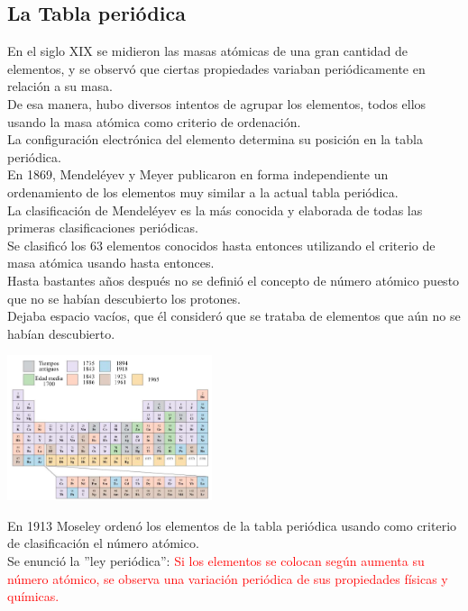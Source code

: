     \subsection{La Tabla periódica}
        \indent En el siglo XIX se midieron las masas atómicas de una gran cantidad de elementos, y se observó que ciertas propiedades variaban periódicamente en relación a su masa. \\
        \indent De esa manera, hubo diversos intentos de agrupar los elementos, todos ellos usando la masa atómica como criterio de ordenación. \\
        \indent La configuración electrónica del elemento determina su posición en la tabla periódica. \\
        \indent En 1869, Mendeléyev y Meyer publicaron en forma independiente un ordenamiento de los elementos muy similar a la actual tabla periódica. \\
        \indent La clasificación de Mendeléyev es la más conocida y elaborada de todas las primeras clasificaciones periódicas. \\
        \indent Se clasificó los 63 elementos conocidos hasta entonces utilizando el criterio de masa atómica usando hasta entonces. \\
        \indent Hasta bastantes años después no se definió el concepto de número atómico puesto que no se habían descubierto los protones. \\
        \indent Dejaba espacio vacíos, que él consideró que se trataba de elementos que aún no se habían descubierto.
        \begin{center} \includegraphics[width=6cm]{./imagenes/tablaPeriodicaMendeleyec.png} \end{center}
        \indent En 1913 Moseley  ordenó los elementos de la tabla periódica usando como criterio de clasificación el número atómico. \\
        \indent Se enunció la ''ley periódica'': \textcolor{red}{Si los elementos se colocan según aumenta su número atómico, se observa una variación periódica de sus propiedades físicas y químicas.} 
